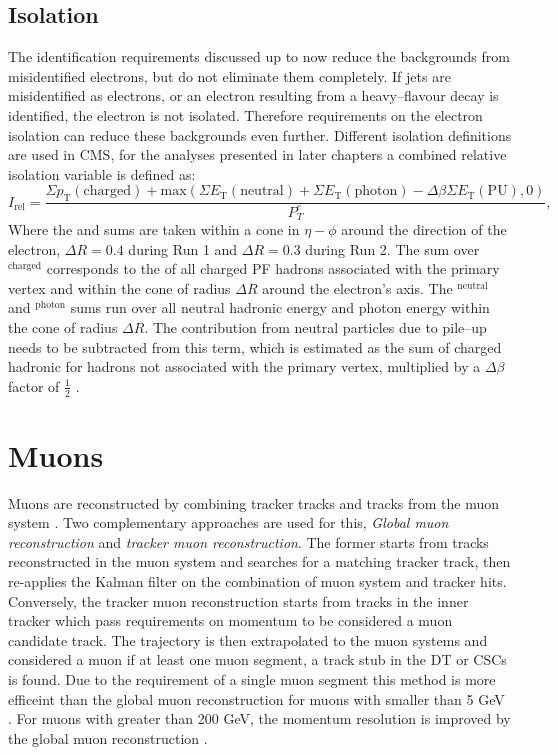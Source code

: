 \subsection{Isolation}
\label{sec:objects_ele_iso}
The identification requirements discussed up to now reduce the backgrounds 
from misidentified electrons, but do not eliminate them completely. If jets are
misidentified as electrons, or an electron resulting from a heavy--flavour 
decay is identified, the electron is not isolated. Therefore requirements
on the electron isolation can reduce these backgrounds even further.
Different isolation definitions are used in \ac{CMS}, for the analyses presented
in later chapters a combined relative isolation variable is defined as:
\begin{equation}\label{eqn:electron_reliso}
I_{\text{rel}} = \frac{\Sigma p_{\text{T}}(\text{charged}) + \mathrm{max}(\Sigma E_{\text{T}}(\text{neutral}) + \Sigma E_{\text{T}}(\text{photon}) - \Delta\beta \Sigma E_{\text{T}}(\text{PU}),0)}{P_{T}^{e}},
\end{equation}
Where the \pT and \ET sums are taken within a cone in $\eta - \phi$ around the direction
of the electron, $\Delta R = 0.4$ during Run 1 and $\Delta R = 0.3$ during Run 2.
The sum over \pT$^{\text{charged}}$ corresponds to the \pT of all charged \ac{PF} 
hadrons associated with the primary vertex and within the cone of radius $\Delta R$ around
the electron's axis. The \ET$^{\text{neutral}}$ and \ET$^{\text{photon}}$ sums
run over all neutral hadronic energy and photon energy within the cone of radius $\Delta R$.
The contribution from neutral particles due to pile--up needs to be subtracted from
this term, which is estimated as the sum of charged hadronic \pT for hadrons not associated
with the primary vertex, multiplied by a $\Delta \beta$ factor of $\frac{1}{2}$ \cite{SMHtautauCMS}.


\section{Muons}
\label{sec:objects_muo}
Muons are reconstructed by combining tracker tracks and tracks
from the muon system \cite{cms-muon-reco}. Two complementary approaches are used for this,
\textit{Global muon reconstruction} and \textit{tracker muon reconstruction}. The former starts from 
tracks reconstructed in the muon system and searches for a matching
tracker track, then re-applies the Kalman filter on the combination
of muon system and tracker hits. Conversely, the tracker muon reconstruction starts from
tracks in the inner tracker which pass requirements on momentum to be considered
a muon candidate track. The trajectory is then extrapolated to the muon systems and
considered a muon if at least one muon segment, a track stub in the \ac{DT} or \ac{CSCs} is found.
Due to the requirement of a single muon segment this method is more efficeint than the global muon
reconstruction for muons with \pT smaller than 5 GeV \cite{cms-muon-reco}.
For muons with \pT greater than 200 GeV, the momentum resolution is improved
by the global muon reconstruction \cite{cms-muon-cosmics-perf}.

